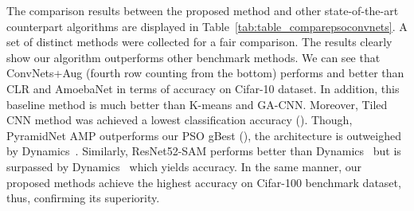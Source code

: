 \documentclass{ieeeaccess}
\begin{document}
The comparison results between the proposed method and other state-of-the-art counterpart algorithms are displayed in Table~\ref{tab:table_comparepsoconvnets}. A set of distinct methods were collected for a fair comparison. The results clearly show our algorithm outperforms other benchmark methods. We can see that ConvNets+Aug (fourth row counting from the bottom) performs  and  better than CLR and AmoebaNet in terms of accuracy on Cifar-10 dataset. In addition, this baseline method is much better than K-means and GA-CNN. Moreover, Tiled CNN method was achieved a lowest classification accuracy (). Though, PyramidNet AMP outperforms our PSO gBest (), the architecture is outweighed by Dynamics~. Similarly, ResNet52-SAM performs better than Dynamics~ but is surpassed by Dynamics~ which yields  accuracy. In the same manner, our proposed methods achieve the highest accuracy on Cifar-100 benchmark dataset, thus, confirming its superiority.
\end{document}
